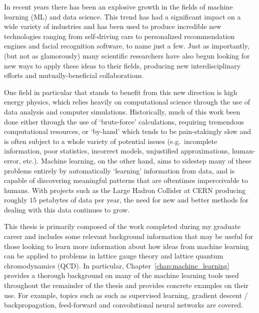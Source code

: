 \documentclass[../main.tex]{subfiles}
\begin{document}
In recent years there has been an explosive growth in the fields of machine
learning (ML) and data science.
%
This trend has had a significant impact on a wide variety of industries and has
been used to produce incredible new technologies ranging from self-driving cars
to personalized recommendation engines and facial recognition software, to name
just a few.
%
Just as importantly, (but not as glamorously) many scientific researchers have
also begun looking for new ways to apply these ideas to their fields, producing
new interdisciplinary efforts and mutually-beneficial collaborations.
%

One field in particular that stands to benefit from this new direction is high
energy physics, which relies heavily on computational science through the use
of data analysis and computer simulations.
%
Historically, much of this work been done either through the use of
`brute-force' calculations, requiring tremendous computational resources, or
`by-hand' which tends to be pain-stakingly slow and is often subject to a whole
variety of potential issues (e.g.\ incomplete information, poor statistics,
incorrect models, unjustified approximations, human-error, etc.).
%
%
Machine learning, on the other hand, aims to sidestep many of these problems
entirely by automatically `learning' information from data, and is capable of
discovering meaningful patterns that are oftentimes imperceivable to humans.
%
With projects such as the Large Hadron Collider at CERN producing roughly $15$
petabytes of data per year, the need for new and better methods for dealing
with this data continues to grow.
  
This thesis is primarily composed of the work completed during my graduate
career and includes some relevant background information that may be useful for
those looking to learn more information about how ideas from machine learning
can be applied to problems in lattice gauge theory and lattice quantum
chromodynamics (QCD).
%
In particular, Chapter~\ref{chap:machine_learning} provides a thorough
background on many of the machine learning tools used throughout the remainder
of the thesis and provides concrete examples on their use.
%
For example, topics such as such as supervised learning, gradient descent /
backpropagation, feed-forward and convolutional neural networks are covered.
\end{document}
